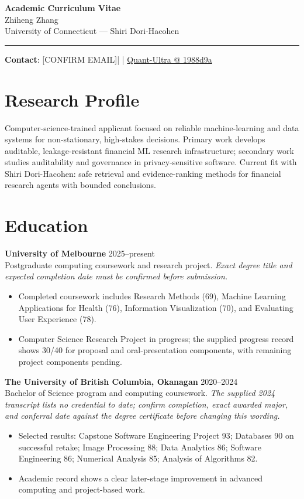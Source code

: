 \documentclass[11pt]{article}
\makeatletter
\newcommand{\ApplicantName}{Zhiheng Zhang}
\newcommand{\ApplicantEmail}{[CONFIRM EMAIL]}
\newcommand{\ApplicantPhone}{[CONFIRM PHONE]}
\newcommand{\ApplicantGitHub}{\href{https://github.com/zhiheng-zhang-Mera/Quant-Ultra/tree/1988d9a8530da91a8158de864d098ea869098923}{Quant-Ultra @ 1988d9a}}
\makeatother
\begin{document}
\begin{center}
{\LARGE\bfseries Academic Curriculum Vitae}\\[0.25em]
{\large \ApplicantName}\\
University of Connecticut --- Shiri Dori-Hacohen
\end{center}
\vspace{0.35em}\hrule\vspace{0.65em}

\textbf{Contact}: \ApplicantEmail\quad | \quad \ApplicantPhone\quad | \quad \ApplicantGitHub

\section*{Research Profile}
Computer-science-trained applicant focused on reliable machine-learning and data systems for non-stationary, high-stakes decisions. Primary work develops auditable, leakage-resistant financial ML research infrastructure; secondary work studies auditability and governance in privacy-sensitive software. Current fit with Shiri Dori-Hacohen: safe retrieval and evidence-ranking methods for financial research agents with bounded conclusions.

\section*{Education}
\textbf{University of Melbourne} \hfill 2025--present\\
Postgraduate computing coursework and research project. \textit{Exact degree title and expected completion date must be confirmed before submission.}
\begin{itemize}
\item Completed coursework includes Research Methods (69), Machine Learning Applications for Health (76), Information Visualization (70), and Evaluating User Experience (78).
\item Computer Science Research Project in progress; the supplied progress record shows 30/40 for proposal and oral-presentation components, with remaining project components pending.
\end{itemize}

\textbf{The University of British Columbia, Okanagan} \hfill 2020--2024\\
Bachelor of Science program and computing coursework. \textit{The supplied 2024 transcript lists no credential to date; confirm completion, exact awarded major, and conferral date against the degree certificate before changing this wording.}
\begin{itemize}
\item Selected results: Capstone Software Engineering Project 93; Databases 90 on successful retake; Image Processing 88; Data Analytics 86; Software Engineering 86; Numerical Analysis 85; Analysis of Algorithms 82.
\item Academic record shows a clear later-stage improvement in advanced computing and project-based work.
\end{itemize}
\end{document}
